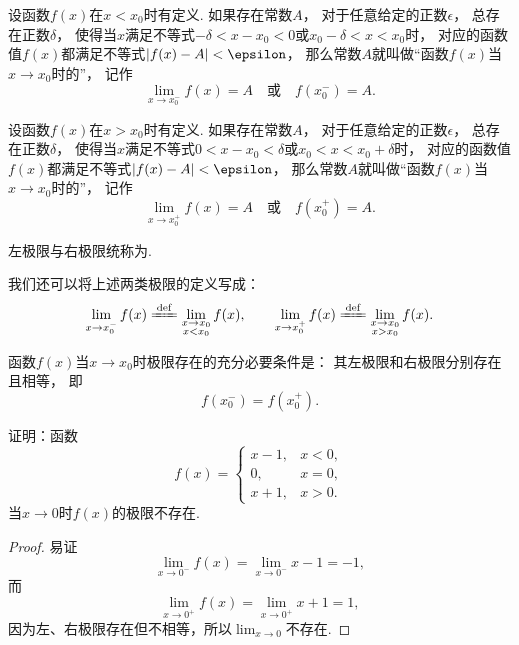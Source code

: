 \begin{definition}\label{definition:极限.函数极限的定义2}
设函数\(f(x)\)在\(x < x_0\)时有定义.
如果存在常数\(A\)，
对于任意给定的正数\(\epsilon\)，
总存在正数\(\delta\)，
使得当\(x\)满足不等式\(-\delta < x - x_0 < 0\)或\(x_0 - \delta < x < x_0\)时，
对应的函数值\(f(x)\)都满足不等式\(\abs{f(x) - A} < \epsilon\)，
那么常数\(A\)就叫做“函数\(f(x)\)当\(x \to x_0\)时的”，
记作\[
	\lim_{x \to x_0^-} f(x) = A
	\quad\text{或}\quad
	f(x_0^-) = A.
\]
\end{definition}

\begin{definition}\label{definition:极限.函数极限的定义3}
设函数\(f(x)\)在\(x > x_0\)时有定义.
如果存在常数\(A\)，
对于任意给定的正数\(\epsilon\)，
总存在正数\(\delta\)，
使得当\(x\)满足不等式\(0 < x - x_0 < \delta\)或\(x_0 < x < x_0 + \delta\)时，
对应的函数值\(f(x)\)都满足不等式\(\abs{f(x) - A} < \epsilon\)，
那么常数\(A\)就叫做“函数\(f(x)\)当\(x \to x_0\)时的”，
记作\[
	\lim_{x \to x_0^+} f(x) = A
	\quad\text{或}\quad
	f(x_0^+) = A.
\]
\end{definition}
左极限与右极限统称为.

\begin{remark}
我们还可以将上述两类极限的定义写成：\begin{gather*}
	\lim_{x\to x_0^-} f(x)
	\defeq
	\lim_{\substack{x \to x_0 \\ x < x_0}} f(x), \qquad
	\lim_{x\to x_0^+} f(x)
	\defeq
	\lim_{\substack{x \to x_0 \\ x > x_0}} f(x).
\end{gather*}
\end{remark}

\begin{theorem}
函数\(f(x)\)当\(x \to x_0\)时极限存在的充分必要条件是：
其左极限和右极限分别存在且相等，
即\[
	f(x_0^-) = f(x_0^+).
\]
\end{theorem}

\begin{example}
证明：函数\[
f(x) = \left\{ \begin{array}{lc}
x-1, & x<0, \\
0, & x=0, \\
x+1, & x>0.
\end{array} \right.
\]当\(x\to0\)时\(f(x)\)的极限不存在.
\begin{proof}
易证\[
\lim_{x\to0^-} f(x) = \lim_{x\to0^-} x-1 = -1,
\]而\[
\lim_{x\to0^+} f(x) = \lim_{x\to0^+} x+1 = 1,
\]因为左、右极限存在但不相等，所以\(\lim_{x\to0}\)不存在.
\end{proof}
\end{example}

